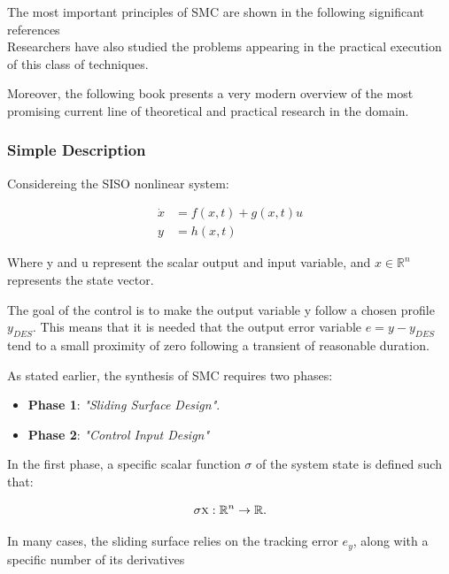 \documentclass{thesisreport}
\begin{document}
The most important principles of SMC are shown in the following significant references \cite{Utkin1997,DeCarlo1998,Hung1993}\\



Researchers have also studied the problems appearing in the practical execution of this class of techniques. \cite{Young1999}

Moreover, the following book presents a very modern overview of the most promising current line of theoretical and practical research in the domain.

 
 \subsubsection{Simple Description}
 
 Considereing the SISO nonlinear system:
 
 \begin{align}
 \dot{x} &=f(x,t)+g(x,t)u \label{SISO_1}\\
 y &= h(x,t) \label{SISO_2}
 \end{align}


Where y and u represent the scalar output and input variable, and $x \in \mathbb{R}^n$ represents the state vector.



The goal of the control is to make the output variable y follow a chosen profile $y_{DES}$. This means that it is needed that the
output error variable $e=y-y_{DES}$ tend to a small proximity of zero following a transient of reasonable duration.


As stated earlier, the synthesis of SMC requires two phases:

\begin{itemize}
	\item [] \textbf{Phase 1}: \textit{"Sliding Surface Design"}.
	\item [] \textbf{Phase 2}: \textit{"Control Input Design"}
\end{itemize}


In the first phase, a specific scalar function $\sigma$ of the system state is defined such that:

\begin{equation*}
	\sigma{\textsc{x}}:\mathbb{R}^n \rightarrow \mathbb{R}.
\end{equation*}


In many cases, the sliding surface relies on the tracking error $e_y$, along with a specific number of its derivatives
\end{document}
